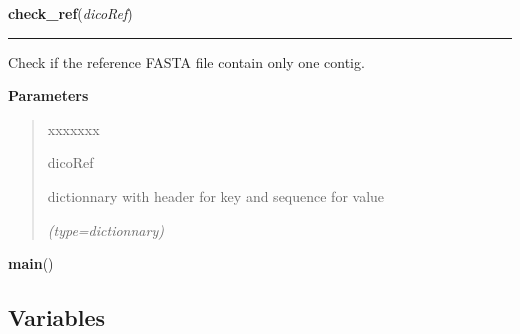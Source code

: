 \hspace{.8\funcindent}\begin{boxedminipage}{\funcwidth}

    \raggedright \textbf{check\_ref}(\textit{dicoRef})

    \vspace{-1.5ex}

    \rule{\textwidth}{0.5\fboxrule}
\setlength{\parskip}{2ex}
    Check if the reference FASTA file contain only one contig.

\setlength{\parskip}{1ex}
      \textbf{Parameters}
      \vspace{-1ex}

      \begin{quote}
        \begin{Ventry}{xxxxxxx}

          \item[dicoRef]

          dictionnary with header for key and sequence for value

            {\it (type=dictionnary)}

        \end{Ventry}

      \end{quote}

    \end{boxedminipage}

    \label{script-VCFtoPseudoGenome:main}

    \vspace{0.5ex}

\hspace{.8\funcindent}\begin{boxedminipage}{\funcwidth}

    \raggedright \textbf{main}()

\setlength{\parskip}{2ex}
\setlength{\parskip}{1ex}
    \end{boxedminipage}



  \subsection{Variables}

